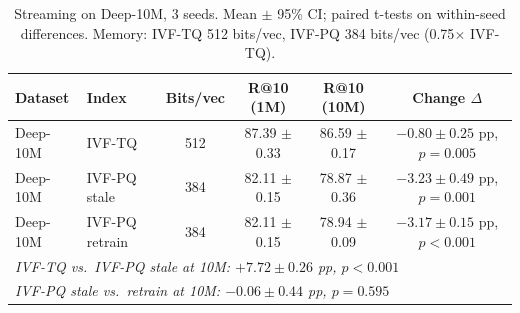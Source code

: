 \begin{table}[t]
\caption{Streaming on Deep-10M, 3 seeds. Mean $\pm$ 95\% CI; paired t-tests on within-seed differences. Memory: IVF-TQ 512 bits/vec, IVF-PQ 384 bits/vec (0.75$\times$ IVF-TQ).}
\label{tab:streaming_deep10m_multiseed}
\centering\small
\begin{tabular}{llcccc}
\toprule
Dataset & Index & Bits/vec & R@10 (1M) & R@10 (10M) & Change $\Delta$ \\
\midrule
  Deep-10M & IVF-TQ & 512 & 87.39 $\pm$ 0.33 & 86.59 $\pm$ 0.17 & $-0.80 \pm 0.25$ pp, $p=0.005$ \\
  Deep-10M & IVF-PQ stale & 384 & 82.11 $\pm$ 0.15 & 78.87 $\pm$ 0.36 & $-3.23 \pm 0.49$ pp, $p=0.001$ \\
  Deep-10M & IVF-PQ retrain & 384 & 82.11 $\pm$ 0.15 & 78.94 $\pm$ 0.09 & $-3.17 \pm 0.15$ pp, $p<0.001$ \\
\midrule
\multicolumn{6}{l}{\textit{IVF-TQ vs.\ IVF-PQ stale at 10M: $+7.72 \pm 0.26$ pp, $p<0.001$}} \\
\multicolumn{6}{l}{\textit{IVF-PQ stale vs.\ retrain at 10M: $-0.06 \pm 0.44$ pp, $p=0.595$}} \\
\bottomrule
\end{tabular}
\end{table}
